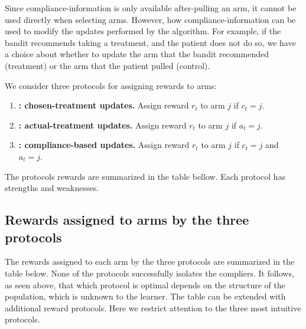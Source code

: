 Since compliance-information is only available after-pulling an arm, it cannot be used directly when selecting arms. However, how compliance-information can be used to modify the updates performed by the algorithm. For example, if the bandit recommends taking a treatment, and the patient does not do so, we have a choice about whether to update the arm that the bandit recommended (treatment) or the arm that the patient pulled (control).


\begin{defn}\label{def:protocols}\eod
	We consider three protocols for assigning rewards to arms:
	\begin{enumerate}[P1.]
		\item \textbf{\chosen: chosen-treatment updates.}
		Assign reward $r_t$ to arm $j$ if $c_t=j$.
		\item \textbf{\actual: actual-treatment updates.}
		Assign reward $r_t$ to arm $j$ if $a_t=j$.
		\item \textbf{\comply: compliance-based updates.}
		Assign reward $r_t$ to arm $j$ if $c_t=j$ and $a_t=j$.
	\end{enumerate}
\end{defn}
The protocols rewards are summarized in the table bellow. Each protocol has strengths and weaknesses.

\subsection{Rewards assigned to arms by the three protocols}
\label{sec:protocol_table}

The rewards assigned to each arm by the three protocols are summarized in the table below. None of the protocols successfully isolates the compliers. It follows, as seen above, that which protocol is optimal depends on the structure of the population, which is unknown to the learner. The table can be extended with additional reward protocols. Here we restrict attention to the three most intuitive protocols.


